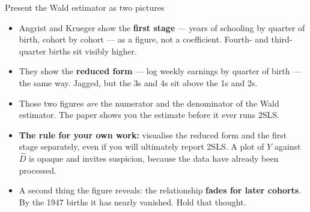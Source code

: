 \documentclass[
  11pt,
  ignorenonframetext,
  aspectratio=169,
]{beamer}
\providecommand{\tightlist}{%
  \setlength{\itemsep}{0pt}\setlength{\parskip}{0pt}}
\begin{document}
\begin{frame}{Present the Wald estimator as two pictures}
\protect{}\label{present-the-wald-estimator-as-two-pictures}
\begin{itemize}
\tightlist
\item
  Angrist and Krueger show the \textbf{first stage} --- years of
  schooling by quarter of birth, cohort by cohort --- as a figure, not a
  coefficient. Fourth- and third-quarter births sit visibly higher.
\item
  They show the \textbf{reduced form} --- log weekly earnings by quarter
  of birth --- the same way. Jagged, but the 3s and 4s sit above the 1s
  and 2s.
\item
  Those two figures \emph{are} the numerator and the denominator of the
  Wald estimator. The paper shows you the estimate before it ever runs
  2SLS.
\item
  \textbf{The rule for your own work:} visualise the reduced form and
  the first stage separately, even if you will ultimately report 2SLS. A
  plot of \(Y\) against \(\hat D\) is opaque and invites suspicion,
  because the data have already been processed.
\item
  A second thing the figure reveals: the relationship \textbf{fades for
  later cohorts}. By the 1947 births it has nearly vanished. Hold that
  thought.
\end{itemize}
\end{frame}
\end{document}
